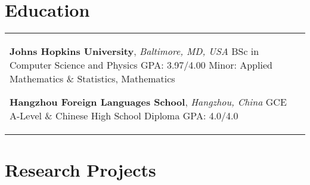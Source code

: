 \documentclass[10pt]{article} %
\begin{document}
\section{Education} 





\begin{supertabular}{L{4cm}@{\hskip 0.3in}L{13cm}} %

	
	
	
	{\textbf{Johns Hopkins University}, \textit{Baltimore, MD, USA}} %
	{BSc in Computer Science and Physics} %
	{GPA: 3.97/4.00} %
	{Minor: Applied Mathematics \& Statistics, Mathematics} %
	
	
	{\textbf{Hangzhou Foreign Languages School}, \textit{Hangzhou, China}} %
	{GCE A-Level \& Chinese High School Diploma}
        {GPA: 4.0/4.0}
        { }	 

\end{supertabular}
\vspace{-0.3cm}

\section{Research Projects}
\end{document}
